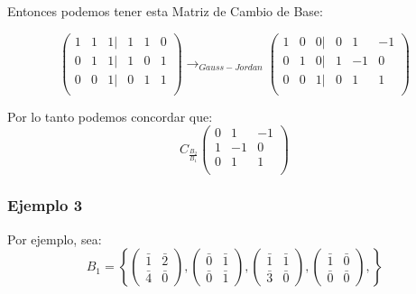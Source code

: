 \documentclass[12pt]{report}							    %
\begin{document}
        Entonces podemos tener esta Matriz de Cambio de Base:

        \begin{equation*}
            \begin{pmatrix}
                1 & 1 & 1 | & 1 & 1 & 0 \\
                0 & 1 & 1 | & 1 & 0 & 1 \\
                0 & 0 & 1 | & 0 & 1 & 1 \\
            \end{pmatrix}
            \to_{Gauss-Jordan}
            \begin{pmatrix}
                1 & 0 & 0 | & 0 & 1 & -1 \\
                0 & 1 & 0 | & 1 & -1 & 0 \\
                0 & 0 & 1 | & 0 & 1 & 1 \\
            \end{pmatrix}
        \end{equation*}

        Por lo tanto podemos concordar que:
        \begin{equation*}
            C_{\frac{B_2}{B_1}}
            \begin{pmatrix}
                0 & 1 & -1 \\
                1 & -1 & 0 \\
                0 & 1 & 1  \\
            \end{pmatrix}
        \end{equation*}



        \subsubsection{Ejemplo 3}

        Por ejemplo, sea:
        \begin{equation*}
            B_1 = \left\{
                \begin{pmatrix}\bar{1}&\bar{2}\\\bar{4}&\bar{0}\end{pmatrix},
                \begin{pmatrix}\bar{0}&\bar{1}\\\bar{0}&\bar{1}\end{pmatrix},
                \begin{pmatrix}\bar{1}&\bar{1}\\\bar{3}&\bar{0}\end{pmatrix},
                \begin{pmatrix}\bar{1}&\bar{0}\\\bar{0}&\bar{0}\end{pmatrix},
            \right\}
        \end{equation*}
\end{document}
